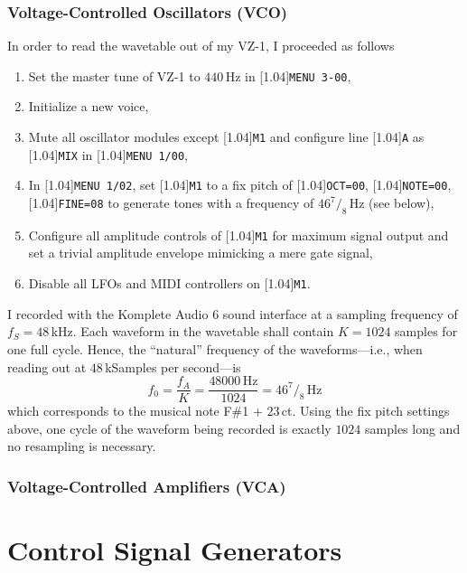 \documentclass[a4paper]{article}
\newcommand{\TT}[1]{\protect\scalebox{0.75}[1.04]{\texttt{#1}}}
\newcommand{\workOn}{\color{Salmon!80!black}}
\newcommand{\workOff}{\color{black}}
\begin{document}
\subsubsection{Voltage-Controlled Oscillators (VCO)}
\workOn
In order to read the wavetable out of my VZ-1, I proceeded as follows
\begin{enumerate}
  \item
    Set the master tune of VZ-1 to $440\,$Hz in \TT{MENU 3-00},
  \item
    Initialize a new voice,
  \item
    Mute all oscillator modules except \TT{M1} and configure line \TT{A} as 
    \TT{MIX} in \TT{MENU 1/00},
  \item 
    In \TT{MENU 1/02}, set \TT{M1} to a fix pitch of \TT{OCT=00}, \TT{NOTE=00},
    \TT{FINE=08} to generate tones with a frequency of $46^7\!/_8$\,Hz (see
    below),
  \item
    Configure all amplitude controls of \TT{M1} for maximum signal output and
    set a trivial amplitude envelope mimicking a mere gate signal,
  \item
    Disable all LFOs and MIDI controllers on \TT{M1}.
\end{enumerate} 
I recorded with the Komplete Audio 6 sound interface at a sampling frequency
of $f_S=48$\,kHz. Each waveform in the wavetable shall contain $K=1024$ samples
for one full cycle. Hence, the ``natural'' frequency of the waveforms---i.e., 
when reading out at $48$\,kSamples per second---is
\begin{equation}
  f_0 
  = \frac{f_A}{K} 
  = \frac{48000\,\text{Hz}}{1024}
  = 46^7\!/_8\,\text{Hz}
\end{equation}
which corresponds to the musical note F\#1 + $23$\,ct. Using the fix pitch
settings above, one cycle of the waveform being recorded is exactly $1024$
samples long and no resampling is necessary.
\workOff

\subsubsection{Voltage-Controlled Amplifiers (VCA)}


\section{Control Signal Generators}
\end{document}
